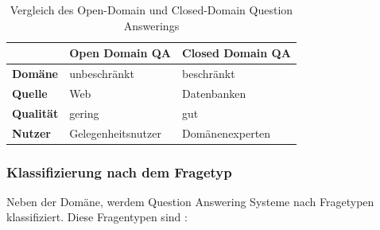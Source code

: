 \documentclass[
        ngerman,
        paper=a4,
        numbers=noendperiod,
]{scrreprt}
\begin{document}
\begin{table}[H]
{\small
    \begin{tabularx}{\textwidth}{X|X|X} 
    
                  &\textbf{Open Domain QA}  & \textbf{Closed Domain QA}  \\ 
\hline    
    \textbf{Domäne}      & unbeschränkt        & beschränkt         \\ 
    \textbf{Quelle}   & Web        & Datenbanken          \\ 
    \textbf{Qualität} & gering        & gut           \\ 
    \textbf{Nutzer} & Gelegenheitsnutzer        & Domänenexperten           \\ 
    \end{tabularx}
\caption{Vergleich des Open-Domain und Closed-Domain Question Answerings}
    \label{tab:tab1}
}
\end{table}


\subsubsection{Klassifizierung nach dem Fragetyp}

Neben der Domäne, werdem Question Answering Systeme nach Fragetypen klassifiziert. Diese Fragentypen sind \citep[S. 20-21]{ChandraASystem}:
\end{document}
